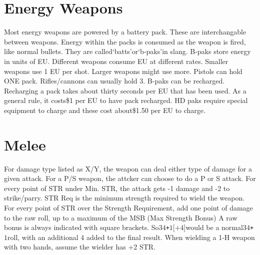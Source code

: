\documentclass[twoside]{book}
\begin{document}
\begin{multicols}{2}
    


\hspace{-2ex}
\vspace{1ex}


    


\hspace{-2ex}
\vspace{1ex}


    
\end{multicols}
  
    

\section{Energy Weapons}
    
    {  
    Most energy weapons are powered by a battery pack. These are interchangable between weapons. Energy within the packs is consumed as the weapon is fired, like normal bullets. They are called`batts'or`b-paks'in slang. B-paks store energy in units of EU. Different weapons consume EU at different rates. Smaller weapons use 1 EU per shot. Larger weapons might use more. Pistols can hold ONE pack. Rifles/cannons can usually hold 3. B-paks can be recharged. Recharging a pack takes about thirty seconds per EU that has been used. As a general rule, it costs\$1 per EU to have pack recharged. HD paks require special equipment to charge and these cost about\$1.50 per EU to charge.
    }
  
    

\section{Melee}
    
    {  
    For damage type listed as X/Y, the weapon can deal either type of damage for a given attack. For a P/S weapon, the attcker can choose to do a P or S attack. For every point of STR under Min. STR, the attack gets -1 damage and -2 to strike/parry. STR Req is the minimum strength required to wield the weapon. For every point of STR over the Strength Requirement, add one point of damage to the raw roll, up to a maximum of the MSB (Max Strength Bonus) A raw bonus is always indicated with square brackets. So\ensuremath{3}\ensuremath{4}\texttt{+}\ensuremath{1}\textscbf{}[\ensuremath{\texttt{+}\ensuremath{4}}]would be a normal\ensuremath{3}\ensuremath{4}\texttt{+}\ensuremath{1}roll, with an additional 4 added to the final result. When wielding a 1-H weapon with two hands, assume the wielder has +2 STR.
    }
  
\end{document}
